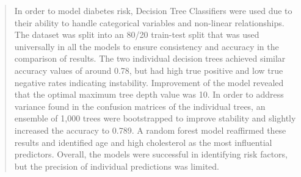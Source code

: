 \documentclass{article}
\theoremstyle{plain}
\theoremstyle{definition}
\theoremstyle{remark}
\begin{document}
\begin{abstract}
In order to model diabetes risk, Decision Tree Classifiers were used due to their ability to handle categorical variables and non-linear relationships. The dataset was split into an 80/20 train-test split that was used universally in all the models to ensure consistency and accuracy in the comparison of results. The two individual decision trees achieved similar accuracy values of around 0.78, but had high true positive and low true negative rates indicating instability. Improvement of the model revealed that the optimal maximum tree depth value was 10. In order to address variance found in the confusion matrices of the individual trees, an ensemble of 1,000 trees were bootstrapped to improve stability and slightly increased the accuracy to 0.789. A random forest model reaffirmed these results and identified age and high cholesterol as the most influential predictors. Overall, the models were successful in identifying risk factors, but the precision of individual predictions was limited.

\end{abstract}
\end{document}
